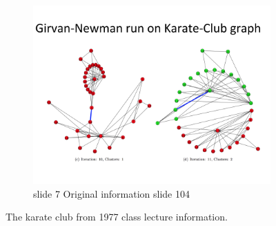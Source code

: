 \documentclass[10pt,letterpaper]{article}
\begin{document}
\begin{figure}[H]
\begin{subfigure}[b]{0.4\linewidth}
     \includegraphics[width=\linewidth]{slide104.png} 
     \caption{slide 7 Original information slide 104}
  \end{subfigure}   
  \caption{The karate club from 1977 class lecture information.}
  \label{fig:slid1}
\end{figure}
\end{document}
